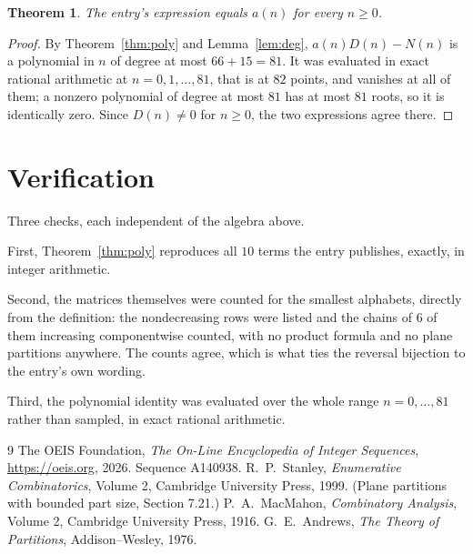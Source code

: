 \documentclass[11pt,a4paper]{article}
\theoremstyle{plain}
\newtheorem{theorem}{Theorem}
\theoremstyle{definition}
\begin{document}
\begin{theorem}
The entry's expression equals $a(n)$ for every $n\ge0$.
\end{theorem}

\begin{proof}
By Theorem~\ref{thm:poly} and Lemma~\ref{lem:deg}, $a(n)D(n)-N(n)$ is a polynomial in $n$
of degree at most $66+15=81$. It was evaluated in exact rational arithmetic at
$n=0,1,\dots,81$, that is at $82$ points, and vanishes at all of them; a nonzero polynomial
of degree at most $81$ has at most $81$ roots, so it is identically zero. Since $D(n)\neq0$
for $n\ge0$, the two expressions agree there.
\end{proof}

\section{Verification}

Three checks, each independent of the algebra above.

First, Theorem~\ref{thm:poly} reproduces all $10$ terms the entry publishes,
exactly, in integer arithmetic.

Second, the matrices themselves were counted for the smallest alphabets, directly from the
definition: the nondecreasing rows were listed and the chains of $6$ of them increasing
componentwise counted, with no product formula and no plane partitions anywhere. The counts
agree, which is what ties the reversal bijection to the entry's own wording.

Third, the polynomial identity was evaluated over the whole range $n=0,\dots,81$ rather than
sampled, in exact rational arithmetic.

\begin{thebibliography}{9}
 The OEIS Foundation, \emph{The On-Line Encyclopedia of Integer
Sequences}, \url{https://oeis.org}, 2026. Sequence A140938.
 R.~P.~Stanley, \emph{Enumerative Combinatorics}, Volume 2, Cambridge
University Press, 1999. (Plane partitions with bounded part size, Section 7.21.)
 P.~A.~MacMahon, \emph{Combinatory Analysis}, Volume 2, Cambridge
University Press, 1916.
 G.~E.~Andrews, \emph{The Theory of Partitions}, Addison--Wesley, 1976.
\end{thebibliography}
\end{document}
